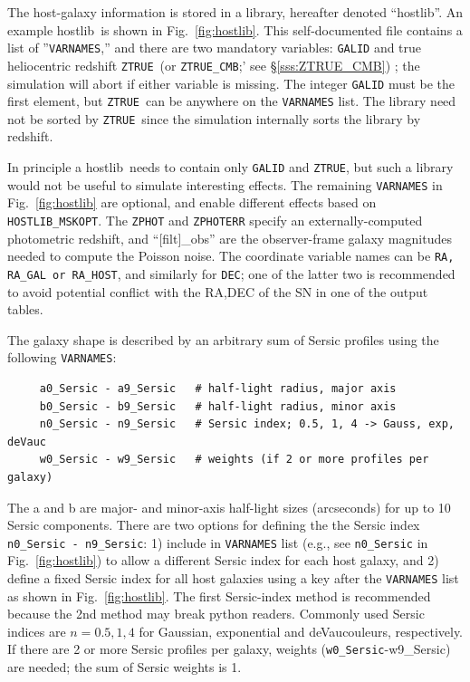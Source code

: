 \documentclass[12pt]{article}
\newcommand{\hostlib}{{\sc hostlib}}
\newcommand{\ztrue}{{\tt ZTRUE}}
\begin{document}
{The host-galaxy information is stored in a library,
hereafter denoted ``{\hostlib}''. An example \hostlib\
is shown in Fig.~\ref{fig:hostlib}.
This self-documented file contains a list of ''{\tt VARNAMES},''  
and there are two mandatory variables: {\tt GALID} and 
true heliocentric redshift \ztrue\ 
(or {\tt ZTRUE\_CMB};' see \S\ref{sss:ZTRUE_CMB}) ; 
the simulation will abort if either variable is missing. 
The integer {\tt GALID} must be the first element,
but \ztrue\ can be anywhere on the {\tt VARNAMES} list.
The library need not be sorted by \ztrue\ since
the simulation internally sorts the library by redshift.

In principle a \hostlib\ needs to contain only
{\tt GALID} and \ztrue, but such a library would
not be useful to simulate interesting effects.
The remaining {\tt VARNAMES} in Fig.~\ref{fig:hostlib}
are optional, and enable different effects based on {\tt HOSTLIB\_MSKOPT}.
The {\tt ZPHOT} and {\tt ZPHOTERR} specify 
an externally-computed photometric redshift, 
and ``[filt]\_obs'' are the observer-frame galaxy
magnitudes needed to compute the Poisson noise.
The coordinate variable names can be {\tt RA, RA\_GAL or RA\_HOST},
and similarly for {\tt DEC}; one of the latter two is recommended
to avoid potential conflict with the RA,DEC of the SN in one of the
output tables.

The galaxy shape is described by an arbitrary sum of Sersic profiles
using the following {\tt VARNAMES}:
\begin{verbatim}
     a0_Sersic - a9_Sersic   # half-light radius, major axis
     b0_Sersic - b9_Sersic   # half-light radius, minor axis
     n0_Sersic - n9_Sersic   # Sersic index; 0.5, 1, 4 -> Gauss, exp, deVauc
     w0_Sersic - w9_Sersic   # weights (if 2 or more profiles per galaxy)
\end{verbatim}
%
The a and b are major- and minor-axis half-light sizes (arcseconds) 
for up to 10 Sersic components.
There are two options for defining the the Sersic index 
{\tt n0\_Sersic - n9\_Sersic}: 
1) include in {\tt VARNAMES} list 
(e.g., see {\tt n0\_Sersic} in Fig.~\ref{fig:hostlib})
to allow a different Sersic index for each host galaxy, and 
2) define a fixed Sersic index for all host galaxies using 
a key after the {\tt VARNAMES} list as shown in Fig.~\ref{fig:hostlib}.
The first Sersic-index method is recommended because the 
2nd method may break python readers.
Commonly used Sersic indices are $n=0.5, 1, 4$ 
for Gaussian, exponential and  deVaucouleurs,
respectively. 
If there are 2 or more Sersic profiles per galaxy, 
weights ({\tt w0\_Sersic}-{w9\_Sersic}) are needed;
the sum of Sersic weights is 1.

}
\end{document}
